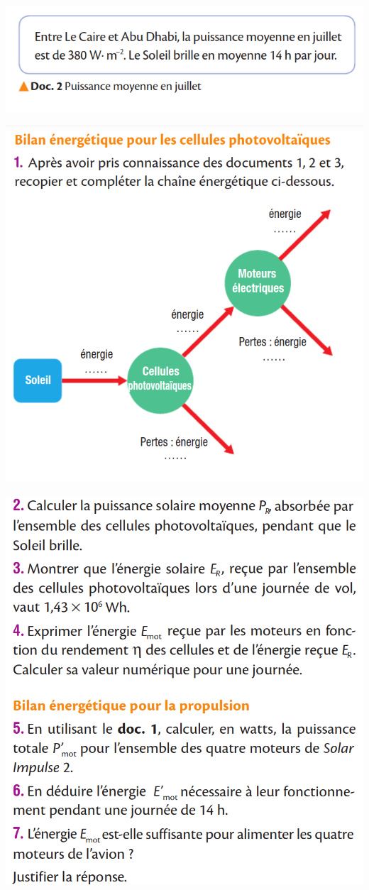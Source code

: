 \documentclass[10pt]{article}
\begin{document}
\begin{minipage}[c]{0.45\textwidth}
	\includegraphics[scale=0.31]{avion_clx/3.png}

	\includegraphics[scale=0.31]{avion_clx/5.png}

	\includegraphics[scale=0.26]{avion_clx/6.png}
\end{minipage}
\end{document}
